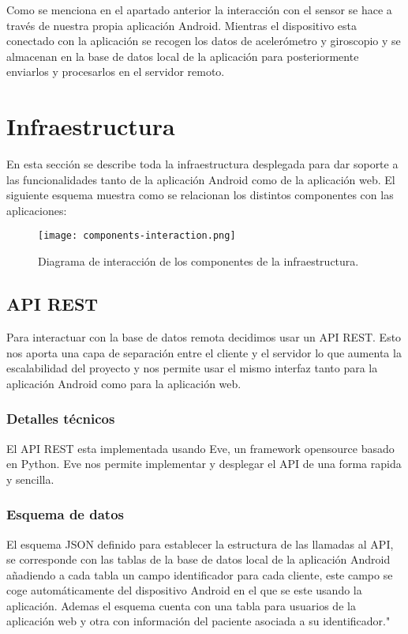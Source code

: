 \documentclass[11pt,spanish]{article}
\begin{document}
Como se menciona en el apartado anterior la interacción con el sensor se hace a través de nuestra propia aplicación Android. Mientras el dispositivo esta conectado con la aplicación se recogen los datos de acelerómetro y giroscopio y se almacenan en la base de datos local de la aplicación para posteriormente enviarlos y procesarlos en el servidor remoto.

\newpage
\section{Infraestructura}
En esta sección se describe toda la infraestructura desplegada para dar soporte a las funcionalidades tanto de la aplicación Android como de la aplicación web. El siguiente esquema muestra como se relacionan los distintos componentes con las aplicaciones:

\begin{figure}[H]
  \centering
  \texttt{[image: components-interaction.png]}
  \caption{Diagrama de interacción de los componentes de la infraestructura.}
\end{figure}


\subsection{API REST}
Para interactuar con la base de datos remota decidimos usar un API REST. Esto nos aporta una capa de separación entre el cliente y el servidor lo que aumenta la escalabilidad del proyecto y nos permite usar el mismo interfaz tanto para la aplicación Android como para la aplicación web.

\subsubsection{Detalles técnicos}
El API REST esta implementada usando Eve, un framework opensource basado en Python. Eve nos permite implementar y desplegar el API de una forma rapida y sencilla.

\subsubsection{Esquema de datos}

El esquema JSON definido para establecer la estructura de las llamadas al API, se corresponde con las tablas de la base de datos local de la aplicación Android añadiendo a cada tabla un campo identificador para cada cliente, este campo se coge automáticamente del dispositivo Android en el que se este usando la aplicación. Ademas el esquema cuenta con una tabla para usuarios de la aplicación web y otra con información del paciente asociada a su identificador."
\end{document}
